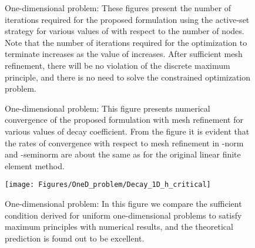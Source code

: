 \documentclass[11pt]{amsart}
\begin{document}
\begin{figure}[h]
  \centering
\caption{One-dimensional problem: These figures present the number of iterations required 
      for the proposed formulation using the active-set strategy for various values of  
      with respect to the number of nodes. Note that the number of iterations required for the 
      optimization to terminate increases as the value of  increases. After sufficient 
      mesh refinement, there will be no violation of the discrete maximum principle, and there 
      is no need to solve the constrained optimization problem.}
    \label{Fig:Decay_1D_active_set_iterations}
\end{figure}

\begin{figure}[h]
  \centering
\caption{One-dimensional problem: This figure presents numerical 
  convergence of the proposed formulation with mesh refinement for 
  various values of decay coefficient. From the figure it is evident 
  that the rates of convergence with respect to mesh refinement in 
  -norm and -seminorm are about the same as for the original 
  linear finite element method.} \label{Fig:Decay_error_convergence_1D}
  \end{figure}
  
\begin{figure}[h]
  \centering
  \texttt{[image: Figures/OneD\_problem/Decay\_1D\_h\_critical]}
  \caption{One-dimensional problem: In this figure we compare the sufficient condition 
  derived for uniform one-dimensional problems to satisfy maximum principles with 
  numerical results, and the theoretical prediction is found out to be excellent.} 
  \label{Fig:Decay_1D_h_critical}
\end{figure}
\end{document}
